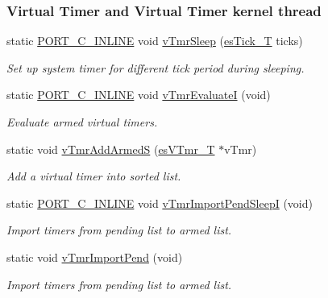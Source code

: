 \subsubsection*{Virtual Timer and Virtual Timer kernel thread}
\begin{DoxyCompactItemize}
\item 
static \hyperlink{group__template__compiler_ga87952d6e574c7f437503926e833ba345}{P\-O\-R\-T\-\_\-\-C\-\_\-\-I\-N\-L\-I\-N\-E} void \hyperlink{group__kern__impl_ga6ebc5795dbcc15e76f768133ba99ab17}{v\-Tmr\-Sleep} (\hyperlink{group__kern__vtmr_ga844873888c186ee81eb66620dadb0451}{es\-Tick\-\_\-\-T} ticks)
\begin{DoxyCompactList}\small\item\em Set up system timer for different tick period during sleeping. \end{DoxyCompactList}\item 
static \hyperlink{group__template__compiler_ga87952d6e574c7f437503926e833ba345}{P\-O\-R\-T\-\_\-\-C\-\_\-\-I\-N\-L\-I\-N\-E} void \hyperlink{group__kern__impl_gab4f2cc4d4d36c36efb272306595a4474}{v\-Tmr\-Evaluate\-I} (void)
\begin{DoxyCompactList}\small\item\em Evaluate armed virtual timers. \end{DoxyCompactList}\item 
static void \hyperlink{group__kern__impl_ga653b749536e91933ea9b651dbb8d5962}{v\-Tmr\-Add\-Armed\-S} (\hyperlink{group__kern__vtmr_ga3c020f0ca54ff412bc1d1505502d2afc}{es\-V\-Tmr\-\_\-\-T} $\ast$v\-Tmr)
\begin{DoxyCompactList}\small\item\em Add a virtual timer into sorted list. \end{DoxyCompactList}\item 
static \hyperlink{group__template__compiler_ga87952d6e574c7f437503926e833ba345}{P\-O\-R\-T\-\_\-\-C\-\_\-\-I\-N\-L\-I\-N\-E} void \hyperlink{group__kern__impl_ga0ac5061b01fd5124dc99cba3a10b6025}{v\-Tmr\-Import\-Pend\-Sleep\-I} (void)
\begin{DoxyCompactList}\small\item\em Import timers from pending list to armed list. \end{DoxyCompactList}\item 
static void \hyperlink{group__kern__impl_ga9ae79f667b0f7420b31e8a609c3150a0}{v\-Tmr\-Import\-Pend} (void)
\begin{DoxyCompactList}\small\item\em Import timers from pending list to armed list. \end{DoxyCompactList}\item 

\end{DoxyCompactItemize}
